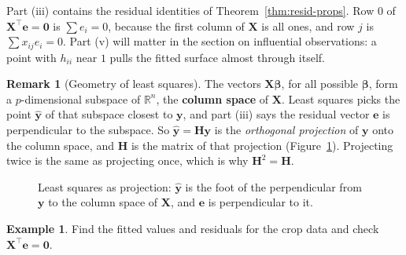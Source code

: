 \documentclass[11pt,a4paper]{article}
\numberwithin{equation}{section}
\theoremstyle{definition}
\newtheorem{exa}[thm]{Example}
\newtheorem*{remark}{Remark}
\begin{document}
Part (iii) contains the residual identities of Theorem~\ref{thm:resid-props}. Row $0$ of
$\mathbf{X}^\top\mathbf{e} = \mathbf{0}$ is $\sum e_i = 0$, because the first column of
$\mathbf{X}$ is all ones, and row $j$ is $\sum x_{ij} e_i = 0$. Part (v) will matter in the
section on influential observations: a point with $h_{ii}$ near $1$ pulls the fitted surface
almost through itself.

\begin{remark}[Geometry of least squares]
The vectors $\mathbf{X}\boldsymbol\beta$, for all possible $\boldsymbol\beta$, form a
$p$-dimensional subspace of $\mathbb{R}^n$, the \textbf{column space} of $\mathbf{X}$.
Least squares picks the point $\hat{\mathbf{y}}$ of that subspace closest to $\mathbf{y}$, and
part (iii) says the residual vector $\mathbf{e}$ is perpendicular to the subspace. So
$\hat{\mathbf{y}} = \mathbf{Hy}$ is the \emph{orthogonal projection} of $\mathbf{y}$ onto the
column space, and $\mathbf{H}$ is the matrix of that projection (Figure~\ref{fig:projection}).
Projecting twice is the same as projecting once, which is why $\mathbf{H}^2 = \mathbf{H}$.
\end{remark}

\begin{figure}[H]
\centering
{}
\caption{Least squares as projection: $\hat{\mathbf{y}}$ is the foot of the perpendicular from
$\mathbf{y}$ to the column space of $\mathbf{X}$, and $\mathbf{e}$ is perpendicular to it.}
\label{fig:projection}
\end{figure}

\begin{exa}\label{exa:crop-resid}
Find the fitted values and residuals for the crop data and check
$\mathbf{X}^\top\mathbf{e} = \mathbf{0}$.
\end{exa}
\end{document}
